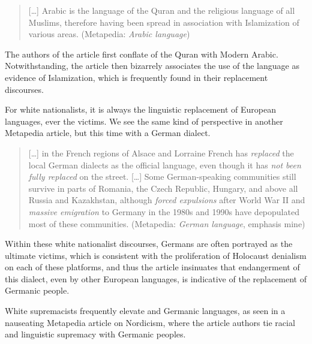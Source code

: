 \documentclass[output=paper,colorlinks,citecolor=brown]{langscibook}
\begin{document}
\begin{quote}
{[}\ldots{]} Arabic is the language of the Quran and the religious language of all Muslims, therefore having been spread in association with Islamization of various areas. (Metapedia: \emph{Arabic language}) 
\end{quote}

\noindent The authors of the article first conflate  of the Quran with Modern Arabic. Notwithstanding, the article then bizarrely associates the use of the language as evidence of Islamization, which is frequently found in their replacement discourses.

For white nationalists, it is always the linguistic replacement of European languages, ever the victims. We see the same kind of perspective in another Metapedia article, but this time with a German dialect.

\begin{quote} 
{[}\ldots{]} in the French regions of Alsace and Lorraine French has \emph{replaced} the local German dialects as the official language, even though it has \emph{not been fully replaced} on the street. {[}\ldots{]} Some German\hyp speaking communities still survive in parts of Romania, the Czech Republic, Hungary, and above all Russia and Kazakhstan, although \emph{forced expulsions} after World War II and \emph{massive emigration} to Germany in the 1980s and 1990s have depopulated most of these communities. (Metapedia: \emph{German language}, emphasis mine) 
\end{quote}

\noindent Within these white nationalist discourses, Germans are often portrayed as the ultimate victims, which is consistent with the proliferation of Holocaust denialism on each of these platforms, and thus the article insinuates that endangerment of this dialect, even by other European languages, is indicative of the replacement of Germanic people.

White supremacists frequently elevate  and Germanic languages, as seen in a nauseating Metapedia article on Nordicism, where the article authors tie racial and linguistic supremacy with Germanic peoples.
\end{document}
